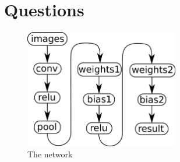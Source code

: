 \documentclass{article}
\begin{document}
\section{Questions}
\begin{figure}[t]
	\centering
	\includegraphics[width=0.6\textwidth]{figures/network}
	\caption{The network}
	\label{fig:network}
\end{figure}
\end{document}
